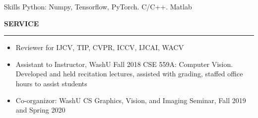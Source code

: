 \documentclass{resume} %
\newcommand{\B}[1]{\textbf{#1}}
\begin{document}


  \begin{rSection}{Skills}
  Python: Numpy, Tensorflow, PyTorch. C/C++. Matlab
  \end{rSection}

  \sectionskip
  \MakeUppercase{\bf Service} %
  \sectionlineskip
  \hrule %

  \begin{itemize}
  \item Reviewer for IJCV, TIP, CVPR, ICCV, IJCAI, WACV\\
  \vspace{-1em}
  \item Assistant to Instructor, WashU Fall 2018 CSE 559A: Computer Vision. Developed and held recitation lectures, assisted with grading, staffed office hours to assist students\\
  \vspace{-1em}
  \item Co-organizor: WashU CS Graphics, Vision, and Imaging Seminar, Fall 2019 and Spring 2020
  \end{itemize}









  
\end{document}
